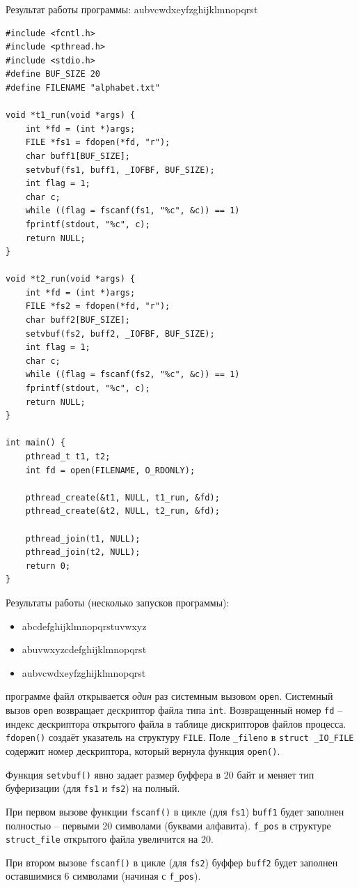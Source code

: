 \documentclass[12pt]{report}
\begin{document}
Результат работы программы: aubvcwdxeyfzghijklmnopqrst

\begin{lstlisting}[caption={\text{Программа №1 (многопоточная)}}]
#include <fcntl.h>
#include <pthread.h>
#include <stdio.h>
#define BUF_SIZE 20
#define FILENAME "alphabet.txt"

void *t1_run(void *args) {
	int *fd = (int *)args;
	FILE *fs1 = fdopen(*fd, "r");
	char buff1[BUF_SIZE];
	setvbuf(fs1, buff1, _IOFBF, BUF_SIZE);
	int flag = 1;
	char c;
	while ((flag = fscanf(fs1, "%c", &c)) == 1)
	fprintf(stdout, "%c", c);
	return NULL;
}

void *t2_run(void *args) {
	int *fd = (int *)args;
	FILE *fs2 = fdopen(*fd, "r");
	char buff2[BUF_SIZE];
	setvbuf(fs2, buff2, _IOFBF, BUF_SIZE);
	int flag = 1;
	char c;
	while ((flag = fscanf(fs2, "%c", &c)) == 1)
	fprintf(stdout, "%c", c);
	return NULL;
}

int main() {
	pthread_t t1, t2;
	int fd = open(FILENAME, O_RDONLY);
	
	pthread_create(&t1, NULL, t1_run, &fd);
	pthread_create(&t2, NULL, t2_run, &fd);
	
	pthread_join(t1, NULL);
	pthread_join(t2, NULL);
	return 0;
}
\end{lstlisting}

Результаты работы (несколько запусков программы): 
\begin{itemize}
\item abcdefghijklmnopqrstuvwxyz
\item abuvwxyzcdefghijklmnopqrst
\item aubvcwdxeyfzghijklmnopqrst
\end{itemize}

 программе файл открывается \textit{один} раз системным вызовом \texttt{open}. Системный вызов \texttt{open} возвращает дескриптор файла типа \texttt{int}. Возвращенный номер \texttt{fd} -- индекс дескриптора открытого файла в таблице дискрипторов файлов процесса.
 \texttt{fdopen()} создаёт указатель на структуру \texttt{FILE}. Поле \texttt{\_fileno} в \texttt{struct \_IO\_FILE} содержит номер дескриптора, который вернула функция \texttt{open()}.
\par Функция \texttt{setvbuf()} явно задает размер буффера в 20 байт и меняет тип буферизации (для \texttt{fs1} и \texttt{fs2}) на полный.
\par При первом вызове функции \texttt{fscanf()} в цикле (для \texttt{fs1}) \texttt{buff1} будет заполнен полностью -- первыми 20 символами (буквами алфавита). \texttt{f\_pos} в структуре \texttt{struct\_file} открытого файла увеличится на 20.
\par При втором вызове \texttt{fscanf()} в цикле (для \texttt{fs2}) буффер \texttt{buff2} будет заполнен оставшимися 6 символами (начиная с \texttt{f\_pos}).
\end{document}
